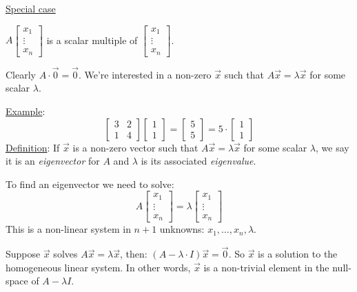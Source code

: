 \documentclass{article}
\newcommand{\tmem}[1]{{\em #1\/}}
\begin{document}
{\underline{Special case}}

$A \left[\begin{array}{c}
  x_1\\
  \vdots\\
  x_n
\end{array}\right]$ is a scalar multiple of $\left[\begin{array}{c}
  x_1\\
  \vdots\\
  x_n
\end{array}\right]$.

Clearly $A \cdot \vec{0} = \vec{0}$. We're interested in a non-zero $\vec{x}$
such that $A \vec{x} = \lambda \vec{x}$ for some scalar $\lambda$.

{\underline{Example}}:
\[ \left[\begin{array}{cc}
     3 & 2\\
     1 & 4
   \end{array}\right]  \left[\begin{array}{c}
     1\\
     1
   \end{array}\right] = \left[\begin{array}{c}
     5\\
     5
   \end{array}\right] = 5 \cdot \left[\begin{array}{c}
     1\\
     1
   \end{array}\right] \]
{\underline{Definition}}: If $\vec{x}$ is a non-zero vector such that $A
\vec{x} = \lambda \vec{x}$ for some scalar $\lambda$, we say it is an
{\tmem{eigenvector}} for $A$ and $\lambda$ is its associated
{\tmem{eigenvalue}}.

To find an eigenvector we need to solve:
\[ A \left[\begin{array}{c}
     x_1\\
     \vdots\\
     x_n
   \end{array}\right] = \lambda \left[\begin{array}{c}
     x_1\\
     \vdots\\
     x_n
   \end{array}\right] \]
This is a non-linear system in $n + 1$ unknowns: $x_1, \ldots, x_n, \lambda$.

Suppose $\vec{x}$ solves $A \vec{x} = \lambda \vec{x}$, then: $(A - \lambda
\cdot I)  \vec{x} = \vec{0}$. So $\vec{x}$ is a solution to the homogeneous
linear system. In other words, $\vec{x}$ is a non-trivial element in the
null-space of $A - \lambda I$.
\end{document}

